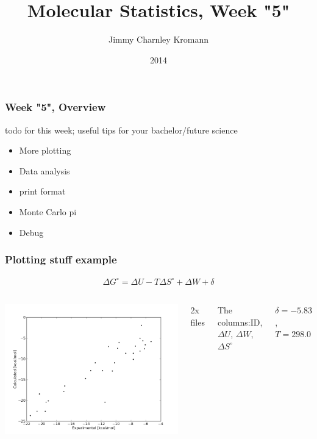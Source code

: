 \documentclass{beamer}
\title[]{Molecular Statistics, Week "5"}
\institute[University of Copenhagen]{Department of Chemistry \\ University of Copenhagen}
\author[Jimmy Charnley Kromann]{Jimmy Charnley Kromann}
\date{2014}
\begin{document}
\frame[plain]{\titlepage}


\begin{frame}[fragile]

    \frametitle{Week "5", Overview}

    todo for this week; useful tips for your bachelor/future science

    \begin{itemize}
        \item More plotting
        \item Data analysis
        \item print format
        \item Monte Carlo pi
        \item Debug
    \end{itemize}

\end{frame}


\begin{frame}[fragile]

    \frametitle{Plotting stuff example}

    \begin{align*}
        \Delta G^\circ = \Delta U - T \Delta S^\circ + \Delta W + \delta
    \end{align*}

    \begin{columns}[t]


            \includegraphics[width=1.2\textwidth]{images/binding_energy.png}


            2x files

            The columns:\newline ID, $\Delta U$, $\Delta W$, $\Delta S^\circ$

            $\delta = -5.83$, $T = 298.0$

    \end{columns}

\end{frame}
\end{document}
